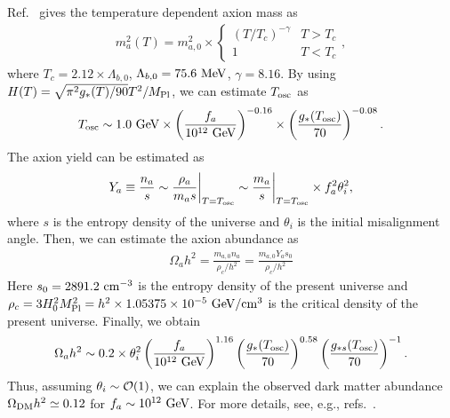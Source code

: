 \documentclass[11pt,a4paper]{article}
\begin{document}
Ref.~\cite{Borsanyi:2016ksw} gives the temperature dependent axion mass as
\begin{align}
    m_a^2(T) = m_{a,0}^2 \times \begin{cases}
        (T/T_c)^{-\gamma} & T>T_c \\
        1 & T<T_c
    \end{cases},
\end{align}
where $T_c = 2.12 \times \Lambda_{b,0}$, $\Lambda_{b,0} = 75.6~{\rm MeV}$, $\gamma = 8.16$.
By using $H(T) = \sqrt{\pi^2 g_*(T)/90} T^2/M_{\rm Pl}$, we can estimate $T_{\rm osc}$ as
\begin{align}
    T_{\rm osc} \sim 1.0~{\rm GeV} \times \left( \frac{f_a}{10^{12}~{\rm GeV}} \right)^{-0.16} \times \left( \frac{g_*(T_{\rm osc})}{70} \right)^{-0.08}.
\end{align}
The axion yield can be estimated as
\begin{align}
    Y_a \equiv \frac{n_a}{s}
    \sim \frac{\rho_a}{m_a s} \biggr|_{T=T_{\rm osc}}
    \sim \frac{m_a }{s} \biggr|_{T=T_{\rm osc}} \times f_a^2 \theta_i^2,
\end{align}
where $s$ is the entropy density of the universe and $\theta_i$ is the initial misalignment angle. Then, we can estimate the axion abundance as
\begin{align}
    \Omega_a h^2
    = \frac{m_{a,0} n_a}{\rho_c/h^2}
    = \frac{m_{a,0} Y_a s_0}{\rho_c/h^2} 
\end{align}
Here $s_0 = 2891.2~{\rm cm^{-3}}$ is the entropy density of the present universe \cite{ParticleDataGroup:2024cfk} and $\rho_c = 3H_0^2 M_{\rm Pl}^2 = h^2 \times 1.05375 \times 10^{-5}~{\rm GeV/cm^3}$ is the critical density of the present universe. Finally, we obtain
\begin{align}
    \Omega_a h^2 \sim 0.2 \times \theta_i^2 \left( \frac{f_a}{10^{12}~{\rm GeV}} \right)^{1.16} \left( \frac{g_*(T_{\rm osc})}{70}\right)^{0.58} \left( \frac{g_{*s}(T_{\rm osc})}{70}\right)^{-1}.
\end{align}
Thus, assuming $\theta_i \sim {\cal O}(1)$, we can explain the observed dark matter abundance $\Omega_{\rm 
DM} h^2 \simeq 0.12$ for $f_a \sim 10^{12}~{\rm GeV}$.
For more details, see, e.g., refs.~\cite{Kawasaki:2013ae,OHare:2024nmr}.
\end{document}
